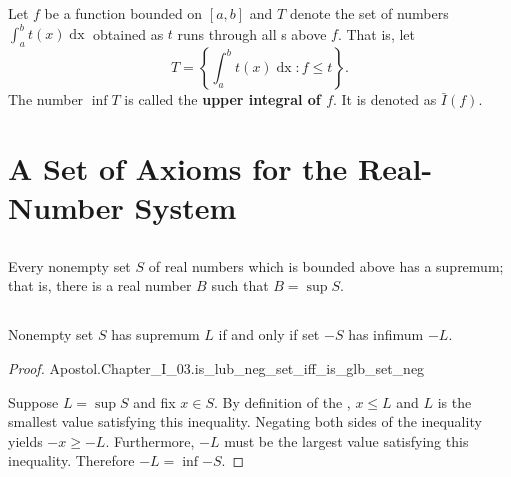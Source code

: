 \documentclass{report}
\begin{document}
\begin{definition}


\end{definition}

\section{}%
\label{sec:def-upper-integral}

Let $f$ be a function bounded on $[a, b]$ and $T$ denote the set of numbers
  $\int_a^b t(x) \mathop{dx}$ obtained as $t$ runs through all
  s above $f$.
That is, let $$T = \left\{ \int_a^b t(x) \mathop{dx} : f \leq t \right\}.$$
The number $\inf{T}$ is called the \textbf{upper integral of $f$}.
It is denoted as $\bar{I}(f)$.

\chapter{A Set of Axioms for the Real-Number System}%
\label{chap:set-axioms-real-number-system}

\section{}%
\label{sec:completeness-axiom}

Every nonempty set $S$ of real numbers which is bounded above has a supremum;
  that is, there is a real number $B$ such that $B = \sup{S}$.

\begin{axiom}


\end{axiom}

\section{}%
\label{sec:lemma-1}

\begin{lemma}[1]

  Nonempty set $S$ has supremum $L$ if and only if set $-S$ has infimum $-L$.

\end{lemma}

\begin{proof}

    {Apostol.Chapter\_I\_03.is\_lub\_neg\_set\_iff\_is\_glb\_set\_neg}

  Suppose $L = \sup{S}$ and fix $x \in S$.
  By definition of the , $x \leq L$ and $L$ is the
    smallest value satisfying this inequality.
  Negating both sides of the inequality yields $-x \geq -L$.
  Furthermore, $-L$ must be the largest value satisfying this inequality.
  Therefore $-L = \inf{-S}$.

\end{proof}
\end{document}
